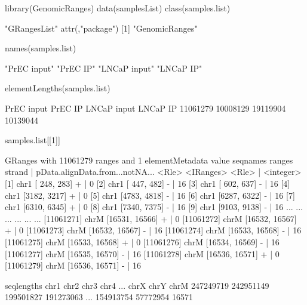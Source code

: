 \begin{Schunk}
\begin{Sinput}
 library(GenomicRanges)
 data(samplesList)
 class(samples.list)
\end{Sinput}
\begin{Soutput}
[1] "GRangesList"
attr(,"package")
[1] "GenomicRanges"
\end{Soutput}
\begin{Sinput}
 names(samples.list)
\end{Sinput}
\begin{Soutput}
[1] "PrEC input"  "PrEC IP"     "LNCaP input" "LNCaP IP"   
\end{Soutput}
\begin{Sinput}
 elementLengths(samples.list)
\end{Sinput}
\begin{Soutput}
 PrEC input     PrEC IP LNCaP input    LNCaP IP 
   11061279    10008129    19119904    10139044 
\end{Soutput}
\begin{Sinput}
 samples.list[[1]]
\end{Sinput}
\begin{Soutput}
GRanges with 11061279 ranges and 1 elementMetadata value
           seqnames         ranges strand   | pData.alignData.from...notNA...
              <Rle>      <IRanges>  <Rle>   |                       <integer>
       [1]     chr1   [ 248,  283]      +   |                               0
       [2]     chr1   [ 447,  482]      -   |                              16
       [3]     chr1   [ 602,  637]      -   |                              16
       [4]     chr1   [3182, 3217]      +   |                               0
       [5]     chr1   [4783, 4818]      -   |                              16
       [6]     chr1   [6287, 6322]      -   |                              16
       [7]     chr1   [6310, 6345]      +   |                               0
       [8]     chr1   [7340, 7375]      -   |                              16
       [9]     chr1   [9103, 9138]      -   |                              16
       ...      ...            ...    ... ...                             ...
[11061271]     chrM [16531, 16566]      +   |                               0
[11061272]     chrM [16532, 16567]      +   |                               0
[11061273]     chrM [16532, 16567]      -   |                              16
[11061274]     chrM [16533, 16568]      -   |                              16
[11061275]     chrM [16533, 16568]      +   |                               0
[11061276]     chrM [16534, 16569]      -   |                              16
[11061277]     chrM [16535, 16570]      -   |                              16
[11061278]     chrM [16536, 16571]      +   |                               0
[11061279]     chrM [16536, 16571]      -   |                              16

seqlengths
      chr1      chr2      chr3      chr4 ...      chrX      chrY      chrM
 247249719 242951149 199501827 191273063 ... 154913754  57772954     16571
\end{Soutput}
\end{Schunk}

